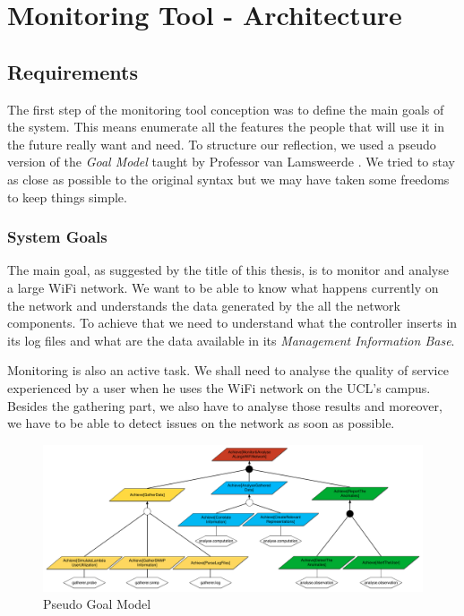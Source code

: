 
\chapter{Monitoring Tool - Architecture} %

\label{Chapter3} %

\section{Requirements}
The first step of the monitoring tool conception was to define the main goals of the system. This means enumerate all the features the people that will use it in the future really want and need. To structure our reflection, we used a pseudo version of the \emph{Goal Model} taught by Professor van Lamsweerde \cite{van2009requirements}. We tried to stay as close as possible to the original syntax but we may have taken some freedoms to keep things simple.

\subsection{System Goals}
The main goal, as suggested by the title of this thesis, is to monitor and analyse a large WiFi network. We want to be able to know what happens currently on the network and understands the data generated by the all the network components. To achieve that we need to understand what the controller inserts in its log files and what are the data available in its \emph{Management Information Base}. 

Monitoring is also an active task. We shall need to analyse the quality of service experienced by a user when he uses the WiFi network on the UCL's campus. Besides the gathering part, we also have to analyse those results and moreover, we have to be able to detect issues on the network as soon as possible.

\begin{figure}[H]
\centering
	\includegraphics[width=1.1\linewidth]{Pictures/chapter3/goals2.png}
	\caption{Pseudo Goal Model}
\end{figure}

